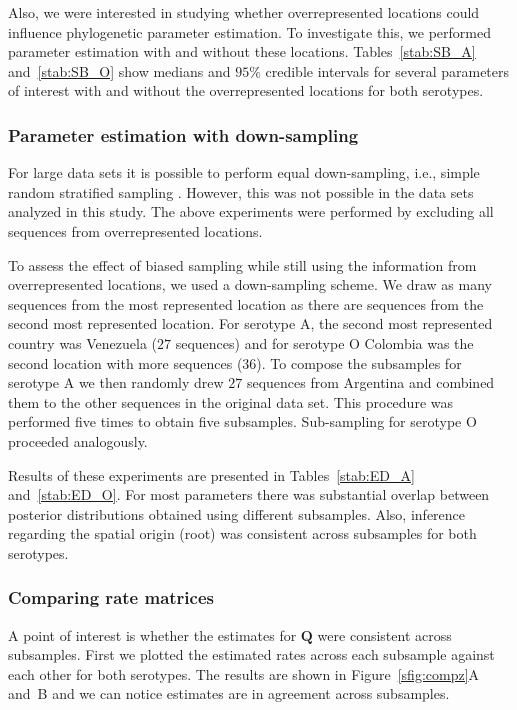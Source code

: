 \documentclass[a4paper,10pt]{article}
\begin{document}
Also, we were interested in studying whether overrepresented locations could influence phylogenetic parameter estimation.
To investigate this, we performed parameter estimation with and without these locations.
Tables~\ref{stab:SB_A} and~\ref{stab:SB_O} show medians and $95 \%$ credible intervals for several parameters of interest with and without the overrepresented locations
for both serotypes.

\subsubsection{Parameter estimation with down-sampling}

For large data sets it is possible to perform equal down-sampling, i.e., simple random stratified sampling \cite{M-fluPNAS}.
However, this was not possible in the data sets analyzed in this study.
The above experiments were performed by excluding all sequences from overrepresented locations.

To assess the effect of biased sampling while still using the information from overrepresented locations, we used a down-sampling scheme.
We draw as many sequences from the most represented location as there are sequences from the second most represented location.
For serotype A, the second most represented country was Venezuela ($27$ sequences) and for serotype O Colombia was the second location with more sequences ($36$).
To compose the subsamples for serotype A we then randomly drew $27$ sequences from Argentina and combined them to the other sequences in the original data set.
This procedure was performed five times to obtain five subsamples.
Sub-sampling for serotype O proceeded analogously.

Results of these experiments are presented in Tables~\ref{stab:ED_A} and~\ref{stab:ED_O}.
For most parameters there was substantial overlap between posterior distributions obtained using different subsamples.
Also, inference regarding the spatial origin (root) was consistent across subsamples for both serotypes.

\subsubsection{Comparing rate matrices}

A point of interest is whether the estimates for $\mathbf{Q}$ were consistent across subsamples.
First we plotted the estimated rates across each subsample against each other for both serotypes.
The results are shown in Figure~\ref{sfig:compz}A and~B and we can notice estimates are in agreement across subsamples.
\end{document}
